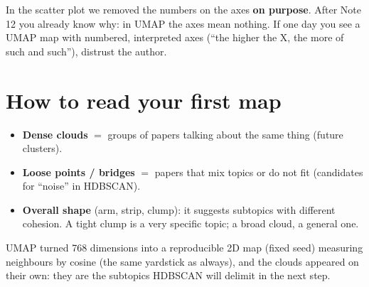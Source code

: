 \documentclass[11pt,a4paper]{article}
\begin{document}
\begin{ojo}
In the scatter plot we removed the numbers on the axes \textbf{on purpose}. After Note 12 you
already know why: in UMAP the axes mean nothing. If one day you see a UMAP map with numbered,
interpreted axes (``the higher the X, the more of such and such''), distrust the author.
\end{ojo}

\section{How to read your first map}

\begin{itemize}
  \item \textbf{Dense clouds} $=$ groups of papers talking about the same thing (future clusters).
  \item \textbf{Loose points / bridges} $=$ papers that mix topics or do not fit (candidates
        for ``noise'' in HDBSCAN).
  \item \textbf{Overall shape} (arm, strip, clump): it suggests subtopics with different
        cohesion. A tight clump is a very specific topic; a broad cloud, a general one.
\end{itemize}

\begin{resumen}
UMAP turned 768 dimensions into a reproducible 2D map (fixed seed) measuring neighbours by
cosine (the same yardstick as always), and the clouds appeared on their own: they are the
subtopics HDBSCAN will delimit in the next step.
\end{resumen}
\end{document}
